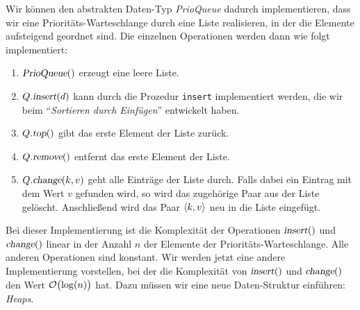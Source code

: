 Wir k\"onnen den abstrakten Daten-Typ \textsl{PrioQueue} dadurch implementieren,
dass wir eine Priorit\"ats-Warteschlange durch eine Liste realisieren, in der die Elemente
aufsteigend geordnet sind. Die einzelnen Operationen werden dann wie folgt implementiert:
\begin{enumerate}
\item $\textsl{PrioQueue}()$ erzeugt eine leere Liste.
\item $Q.\textsl{insert}(d)$ kann durch die Prozedur \texttt{insert} implementiert werden,
      die wir beim ``\emph{Sortieren durch Einf\"ugen}'' entwickelt haben.
\item $Q.\textsl{top}()$ gibt das erste Element der Liste zur\"uck.
\item $Q.\textsl{remove}()$ entfernt das erste Element der Liste.
\item $Q.\textsl{change}(k,v)$ geht alle Eintr\"age der Liste durch.
      Falls dabei ein Eintrag mit dem Wert $v$ gefunden wird, so wird das zugeh\"orige
      Paar aus der Liste gel\"oscht.  Anschlie{\ss}end wird das Paar $\pair(k,v)$ neu in die
      Liste eingef\"ugt.
\end{enumerate}
Bei dieser Implementierung ist die Komplexit\"at der Operationen $\textsl{insert}()$ und
$\textsl{change}()$ linear in der
Anzahl $n$ der Elemente der Priorit\"ats-Warteschlange.  Alle anderen Operationen sind
konstant. Wir werden jetzt eine andere
Implementierung vorstellen, bei der die Komplexit\"at von $\textsl{insert}()$ und
$\textsl{change}()$ den Wert $\mathcal{O}\bigl(\log(n)\bigr)$ hat.  Dazu m\"ussen wir eine neue Daten-Struktur einf\"uhren: \emph{Heaps}.

